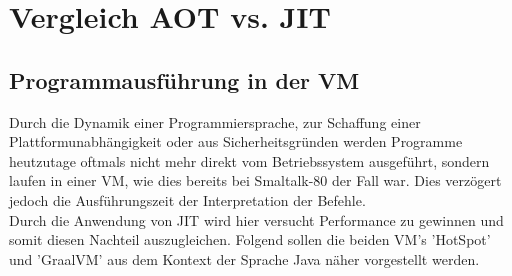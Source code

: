 \chapter{Vergleich AOT vs. JIT}

\section{Programmausführung in der VM} \label{jit_vm}
Durch die Dynamik einer Programmiersprache, zur Schaffung einer Plattformunabhängigkeit oder aus Sicherheitsgründen werden Programme heutzutage oftmals nicht mehr direkt vom Betriebssystem ausgeführt, sondern laufen in einer \ac{VM}, wie dies bereits bei Smaltalk-80 der Fall war. Dies verzögert jedoch die Ausführungszeit der Interpretation der Befehle. \\
Durch die Anwendung von \ac{JIT} wird hier versucht Performance zu gewinnen und somit diesen Nachteil auszugleichen. Folgend sollen die beiden \ac{VM}'s 'HotSpot' und 'GraalVM' aus dem Kontext der Sprache Java näher vorgestellt werden.

